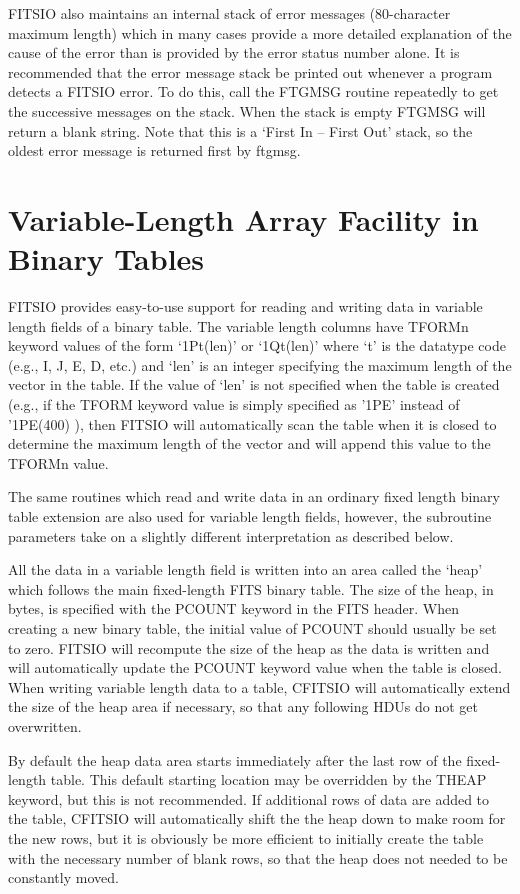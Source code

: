 \documentclass[11pt]{book}
\begin{document}
FITSIO also maintains an internal stack of error messages (80-character
maximum length) which in many cases provide a more detailed explanation
of the cause of the error than is provided by the error status number
alone. It is recommended that the error message stack be printed out
whenever a program detects a FITSIO error. To do this, call the FTGMSG
routine repeatedly to get the successive messages on the stack. When the
stack is empty FTGMSG will return a blank string. Note that this is a
`First In -- First Out' stack, so the oldest error message is returned
first by ftgmsg.


\section{Variable-Length Array Facility in Binary Tables}

FITSIO provides easy-to-use support for reading and writing data in
variable length fields of a binary table. The variable length columns
have TFORMn keyword values of the form `1Pt(len)' or `1Qt(len)' where `t' is the
datatype code (e.g., I, J, E, D, etc.) and `len' is an integer
specifying the maximum length of the vector in the table.  If the value
of `len' is not specified when the table is created (e.g., if the TFORM
keyword value is simply specified as '1PE' instead of '1PE(400) ), then
FITSIO will automatically scan the table when it is closed to
determine the maximum length of the vector and will append this value
to the TFORMn value.

The same routines which read and write data in an ordinary fixed length
binary table extension are also used for variable length fields,
however, the subroutine parameters take on a slightly different
interpretation as described below.

All the data in a variable length field is written into an area called
the `heap' which follows the main fixed-length FITS binary table.  The
size of the heap, in bytes, is specified with the PCOUNT keyword in the
FITS header.  When creating a new binary table, the initial value of
PCOUNT should usually be set to zero.  FITSIO will recompute the size
of the heap as the data is written and will automatically update the
PCOUNT keyword value when the table is closed.  When writing variable
length data to a table, CFITSIO will automatically extend the size
of the heap area if necessary, so that any following HDUs do not
get overwritten.

By default the heap data area starts immediately after the last row of
the fixed-length table.  This default starting location may be
overridden by the THEAP keyword, but this is not recommended.
If additional rows of data are added to the table, CFITSIO will
automatically shift the the heap down to make room for the new
rows, but it is obviously be more efficient to initially
create the table with the necessary number of blank rows, so that
the heap does not needed to be constantly moved.
\end{document}
